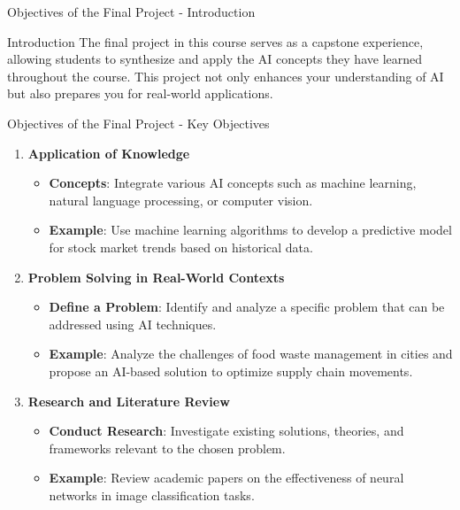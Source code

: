 \documentclass[aspectratio=169]{beamer}
\begin{document}
\begin{frame}[fragile]{Objectives of the Final Project - Introduction}
    \begin{block}{Introduction}
        The final project in this course serves as a capstone experience, allowing students to synthesize and apply the AI concepts they have learned throughout the course. This project not only enhances your understanding of AI but also prepares you for real-world applications.
    \end{block}
\end{frame}

\begin{frame}[fragile]{Objectives of the Final Project - Key Objectives}
    \begin{enumerate}
        \item \textbf{Application of Knowledge}
        \begin{itemize}
            \item \textbf{Concepts}: Integrate various AI concepts such as machine learning, natural language processing, or computer vision.
            \item \textbf{Example}: Use machine learning algorithms to develop a predictive model for stock market trends based on historical data.
        \end{itemize}
        
        \item \textbf{Problem Solving in Real-World Contexts}
        \begin{itemize}
            \item \textbf{Define a Problem}: Identify and analyze a specific problem that can be addressed using AI techniques.
            \item \textbf{Example}: Analyze the challenges of food waste management in cities and propose an AI-based solution to optimize supply chain movements.
        \end{itemize}
        
        \item \textbf{Research and Literature Review}
        \begin{itemize}
            \item \textbf{Conduct Research}: Investigate existing solutions, theories, and frameworks relevant to the chosen problem.
            \item \textbf{Example}: Review academic papers on the effectiveness of neural networks in image classification tasks.
        \end{itemize}
    \end{enumerate}
\end{frame}
\end{document}

